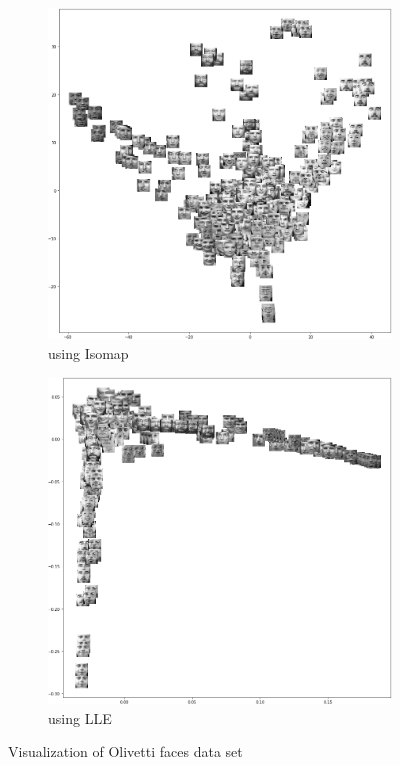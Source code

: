 \begin{figure}
	\centering
	\begin{subfigure}[h]{0.65\textwidth}
		\centering
		\includegraphics[width=\textwidth]{./figures/isomap_1.png}
		\caption{using Isomap}
	\end{subfigure}
	
	\begin{subfigure}[h]{0.65\textwidth}
		\centering
		\includegraphics[width=\textwidth]{./figures/lle_1.png}
		\caption{using LLE}
	\end{subfigure}
	\caption{Visualization of Olivetti faces data set}
\end{figure}

